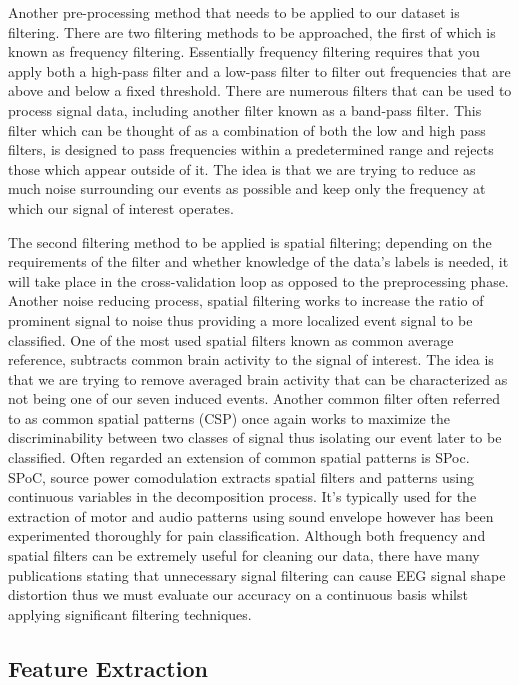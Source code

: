 \documentclass[12pt]{article}
\begin{document}
Another pre-processing method that needs to be applied to our dataset is filtering. There are two filtering methods to be approached, the first of which is known as frequency filtering. Essentially  frequency filtering requires that you apply both a high-pass filter and a low-pass filter to filter out frequencies that are above and below a fixed threshold. There are numerous filters that can be used to process signal data, including another filter known as a band-pass filter. This filter which can be thought of as a combination of both the low and high pass filters, is designed to pass frequencies within a predetermined range and rejects those which appear outside of it. The idea is that we are trying to reduce as much noise surrounding our events as possible and keep only the frequency at which our signal of interest operates.

The second filtering method to be applied is spatial filtering; depending on the requirements of the filter and whether knowledge of the data's labels is needed, it will take place in the cross-validation loop as opposed to the preprocessing phase. Another noise reducing process, spatial filtering works to increase the ratio of prominent signal to noise thus providing a more localized event signal to be classified. One of the most used spatial filters known as common average reference, subtracts common brain activity to the signal of interest. The idea is that we are trying to remove averaged brain activity that can be characterized as not being one of our seven induced events. Another common filter often referred to as common spatial patterns (CSP) once again works to maximize the discriminability between two classes of signal thus isolating our event later to be classified. Often regarded an extension of common spatial patterns is SPoc. SPoC, source power comodulation extracts spatial filters and patterns using continuous variables in the decomposition process. It's typically used for the extraction of motor and audio patterns using sound envelope however has been experimented thoroughly for pain classification. Although both frequency and spatial filters can be extremely useful for cleaning our data, there have many publications stating that unnecessary signal filtering can cause EEG signal shape distortion thus we must evaluate our accuracy on a continuous basis whilst applying significant filtering techniques.


\subsection{Feature Extraction}
\end{document}
